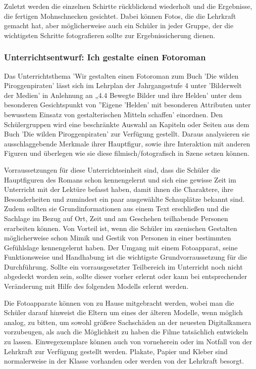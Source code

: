 Zuletzt werden die einzelnen Schirtte rückblickend wiederholt und die Ergebnisse, die fertigen Mohnschnecken gesichtet. Dabei können Fotos, die die Lehrkraft gemacht hat, aber möglicherweise auch ein Schüler in jeder Gruppe, der die wichtigsten Schritte fotografieren sollte zur Ergebnissicherung dienen.

\subsubsection{Unterrichtsentwurf: Ich gestalte einen Fotoroman}

Das Unterrichtsthema 'Wir gestalten einen Fotoroman zum Buch 'Die wilden Piroggenpiraten' lässt sich im Lehrplan der Jahrgangsstufe 4 unter 'Bilderwelt der Medien' in Anlehnung an „4.4 Bewegte Bilder und ihre Helden' unter dem besonderen Gesichtspunkt von ''Eigene 'Helden' mit besonderen Attributen unter bewusstem Einsatz von gestalterischen Mitteln schaffen' einordnen. Den Schülergruppen wird eine beschränkte Auswahl an Kapiteln oder Seiten aus dem Buch 'Die wilden Piroggenpiraten' zur Verfügung gestellt. Daraus analysieren sie ausschlaggebende Merkmale ihrer Hauptfigur, sowie ihre Interaktion mit anderen Figuren und überlegen wie sie diese filmisch/fotografisch in Szene setzen können. 

Vorraussetzungen für diese Unterrichtseinheit sind, dass die Schüler die Hauptfiguren des Romans schon kennengelernt und sich eine gewisse Zeit im Unterricht mit der Lektüre befasst haben, damit ihnen die Charaktere, ihre Besonderheiten und zumindest ein paar ausgewählte Schauplätze bekannt sind. Zudem sollten sie  Grundinformationen aus einem Text erschließen und die Sachlage im Bezug auf Ort, Zeit und am Geschehen teilhabende Personen erarbeiten können. Von Vorteil ist, wenn die Schüler im szenischen Gestalten möglicherweise schon Mimik und Gestik von Personen in einer bestimmten Gefühlslage kennengelernt haben. Der Umgang mit einem Fotoapparat, seine Funktionsweise und Handhabung ist die wichtigste Grundvorraussetzung für die Durchführung. Sollte ein vorrausgesetzter Teilbereich im Unterricht noch nicht abgedeckt worden sein, sollte dieser vorher erlernt oder kann bei entsprechender Veränderung mit Hilfe des folgenden Modells erlernt werden.

Die Fotoapparate können von zu Hause mitgebracht werden, wobei man die Schüler darauf hinweist die Eltern um eines der älteren Modelle, wenn möglich analog, zu bitten, um sowohl größere Sachschäden an der neuesten Digitalkamera vorzubeugen, als auch die Möglichkeit zu haben die Filme tatsächlich entwickeln zu lassen. Einwegexemplare können auch von vorneherein oder im Notfall von der Lehrkraft zur Verfügung gestellt werden. 
Plakate, Papier und Kleber sind normalerweise in der Klasse vorhanden oder werden von der Lehrkraft besorgt.

